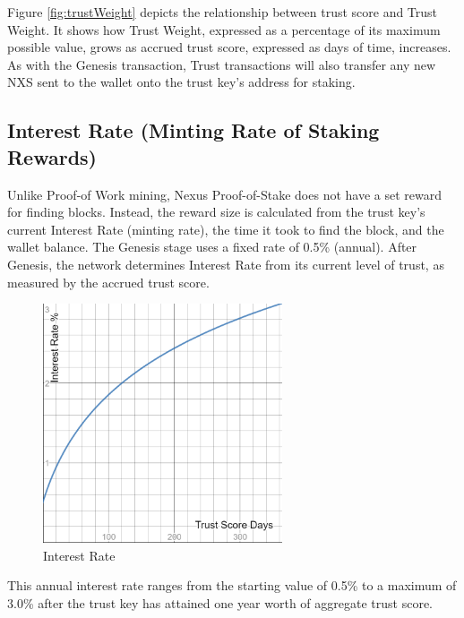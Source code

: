 \documentclass[11pt]{article}
\begin{document}
\noindent Figure \ref{fig:trustWeight} depicts the relationship between trust score and Trust Weight. It shows how Trust Weight, expressed as a percentage of its maximum possible value, grows as accrued trust score, expressed as days of time, increases.\\

\noindent As with the Genesis transaction, Trust transactions will also transfer any new NXS sent to the wallet onto the trust key's address for staking. \\

\subsection{Interest Rate (Minting Rate of Staking Rewards)}
Unlike Proof-of Work mining, Nexus Proof-of-Stake does not have a set reward for finding blocks. Instead, the reward size is calculated from the trust key's current Interest Rate (minting rate), the time it took to find the block, and the wallet balance. The Genesis stage uses a fixed rate of 0.5\% (annual). After Genesis, the network determines Interest Rate from its current level of trust, as measured by the accrued trust score.\\

\begin{figure}[h!]
    \centering
    \includegraphics[width=0.63\textwidth]{images/interestRate.png}
    \caption{Interest Rate \label{fig:interestRate}}
\end{figure}

\noindent This annual interest rate ranges from the starting value of 0.5\% to a maximum of 3.0\% after the trust key has attained one year worth of aggregate trust score. \\
\end{document}
